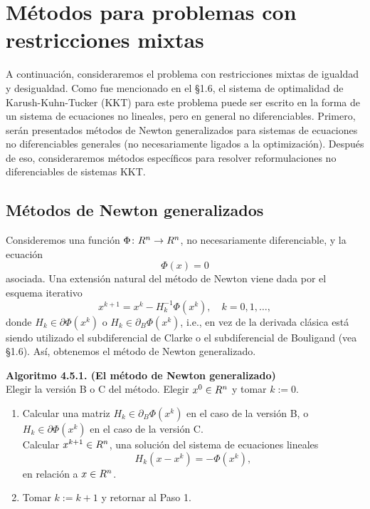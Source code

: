 
\section{Métodos para problemas con restricciones mixtas}\label{v2:sec:4.5}

A continuación, consideraremos el problema con restricciones mixtas de igualdad y desigualdad. Como fue mencionado en el \S 1.6, el sistema de optimalidad de Karush-Kuhn-Tucker (KKT) para este problema puede ser escrito en la forma de un sistema de ecuaciones no lineales, pero en general no diferenciables. Primero, serán presentados métodos de Newton generalizados para sistemas de ecuaciones no diferenciables generales (no necesariamente ligados a la optimización). Después de eso, consideraremos métodos específicos para resolver reformulaciones no diferenciables de sistemas KKT.

\subsection{Métodos de Newton generalizados}\label{v2:sec:4.5.1}

Consideremos una función $\Phi \colon R^n \to R^n$, no necesariamente diferenciable, y la ecuación
\begin{equation}
    \Phi(x) = 0
    \label{v2:eq:4.129}
\end{equation}
asociada. Una extensión natural del método de Newton viene dada por el esquema iterativo
\begin{equation}
    x^{k+1} = x^k - H_k^{-1}\Phi(x^k), \quad k = 0, 1, \dots,
    \label{v2:eq:4.130}
\end{equation}
donde $H_k \in \partial \Phi(x^k)$ o $H_k \in \partial_B \Phi(x^k)$, i.e., en vez de la derivada clásica está siendo utilizado el subdiferencial de Clarke o el subdiferencial de Bouligand (vea \S 1.6). Así, obtenemos el método de Newton generalizado.

\noindent \textbf{Algoritmo 4.5.1. (El método de Newton generalizado)} \\
Elegir la versión B o C del método. Elegir $x^0 \in R^n$ y tomar $k := 0$.
\begin{enumerate}
    \item Calcular una matriz $H_k \in \partial_B \Phi(x^k)$ en el caso de la versión B, o $H_k \in \partial \Phi(x^k)$ en el caso de la versión C. \\
    Calcular $x^{k+1} \in R^n$, una solución del sistema de ecuaciones lineales
    \[
        H_k(x - x^k) = -\Phi(x^k),
    \]
    en relación a $x \in R^n$.
    \item Tomar $k := k + 1$ y retornar al Paso 1.
\end{enumerate}


